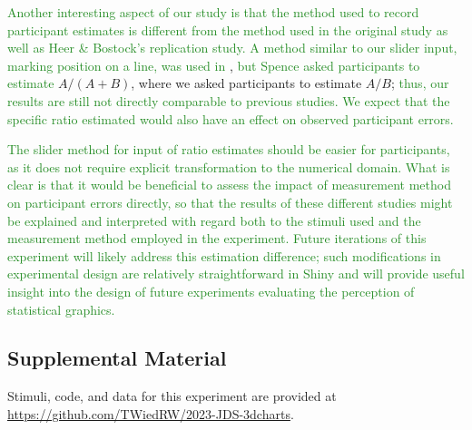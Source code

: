 \documentclass[letterpaper,inpress,dvipsnames]{jdsart}
\begin{document}
{\textcolor{ForestGreen}{Another interesting aspect of our study is that the method used to record participant estimates is different from the method used in the original study as well as Heer \& Bostock's replication study. 
A method similar to our slider input, marking position on a line, was used in}} \citet{spenceVisualPsychophysicsSimple1990}, {\textcolor{ForestGreen}{but Spence asked participants to estimate}} \(A/(A+B)\), where we asked participants to estimate \(A/B\); {\textcolor{ForestGreen}{thus, our results are still not directly comparable to previous studies.
We expect that the specific ratio estimated would also have an effect on observed participant errors.}}

{\textcolor{ForestGreen}{The slider method for input of ratio estimates should be easier for participants, as it does not require explicit transformation to the numerical domain. 
What is clear is that it would be beneficial to assess the impact of measurement method on participant errors directly, so that the results of these different studies might be explained and interpreted with regard both to the stimuli used and the measurement method employed in the experiment.
Future iterations of this experiment will likely address this estimation difference; such modifications in experimental design are relatively straightforward in Shiny and will provide useful insight into the design of future experiments evaluating the perception of statistical graphics.}}

\hypertarget{supplemental-material}{%
\subsection{Supplemental Material}\label{supplemental-material}}

Stimuli, code, and data for this experiment are provided at \url{https://github.com/TWiedRW/2023-JDS-3dcharts}.



\end{document}
